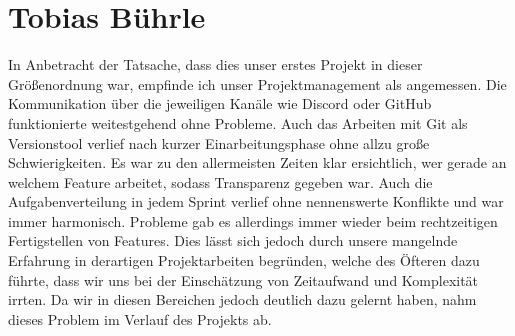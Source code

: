 \section{Tobias Bührle}
In Anbetracht der Tatsache, dass dies unser erstes Projekt in dieser Größenordnung war,
empfinde ich unser Projektmanagement als angemessen. Die Kommunikation über die jeweiligen
Kanäle wie Discord oder GitHub funktionierte weitestgehend ohne Probleme. Auch das
Arbeiten mit Git als Versionstool verlief nach kurzer Einarbeitungsphase ohne allzu große
Schwierigkeiten. Es war zu den allermeisten Zeiten klar ersichtlich, wer gerade an welchem
Feature arbeitet, sodass Transparenz gegeben war. Auch die Aufgabenverteilung in jedem
Sprint verlief ohne nennenswerte Konflikte und war immer harmonisch. Probleme gab es
allerdings immer wieder beim rechtzeitigen Fertigstellen von Features. Dies lässt sich
jedoch durch unsere mangelnde Erfahrung in derartigen Projektarbeiten begründen, welche
des Öfteren dazu führte, dass wir uns bei der Einschätzung von Zeitaufwand und Komplexität
irrten. Da wir in diesen Bereichen jedoch deutlich dazu gelernt haben, nahm dieses Problem
im Verlauf des Projekts ab.

